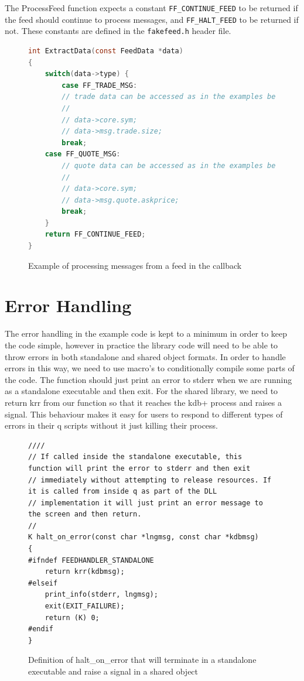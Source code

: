 The ProcessFeed function expects a constant \verb|FF_CONTINUE_FEED| to be returned if the feed should continue to process messages, and \verb|FF_HALT_FEED| to be returned if not. These constants are defined
in the \verb|fakefeed.h| header file.

\begin{figure}
\begin{lstlisting}[language=C]
int ExtractData(const FeedData *data)
{
	switch(data->type) {
		case FF_TRADE_MSG:
		// trade data can be accessed as in the examples below.
		//
		// data->core.sym;
		// data->msg.trade.size;
		break;
	case FF_QUOTE_MSG:
		// quote data can be accessed as in the examples below.
		//
		// data->core.sym;
		// data->msg.quote.askprice;
		break;
	}
	return FF_CONTINUE_FEED;
}
\end{lstlisting}
\caption{Example of processing messages from a feed in the callback}
\end{figure}

\section{Error Handling}

The error handling in the example code is kept to a minimum in order to keep the code simple, however in practice the
library code will need to be able to throw errors in both standalone and shared object formats. In order to handle errors
in this way, we need to use macro's to conditionally compile some parts of the code. The function should just print an
error to stderr when we are running as a standalone executable and then exit. For the shared library, we need to return
krr from our function so that it reaches the kdb+ process and raises a signal. This behaviour makes it easy for users to
respond to different types of errors in their q scripts without it just killing their process.

\begin{figure}
\begin{lstlisting}
////
// If called inside the standalone executable, this function will print the error to stderr and then exit
// immediately without attempting to release resources. If it is called from inside q as part of the DLL
// implementation it will just print an error message to the screen and then return.
//
K halt_on_error(const char *lngmsg, const char *kdbmsg)
{
#ifndef FEEDHANDLER_STANDALONE
	return krr(kdbmsg);
#elseif
	print_info(stderr, lngmsg);
	exit(EXIT_FAILURE);
	return (K) 0;
#endif
}
\end{lstlisting}
\caption{Definition of halt\_on\_error that will terminate in a standalone executable and raise a signal in a shared object}
\end{figure}

